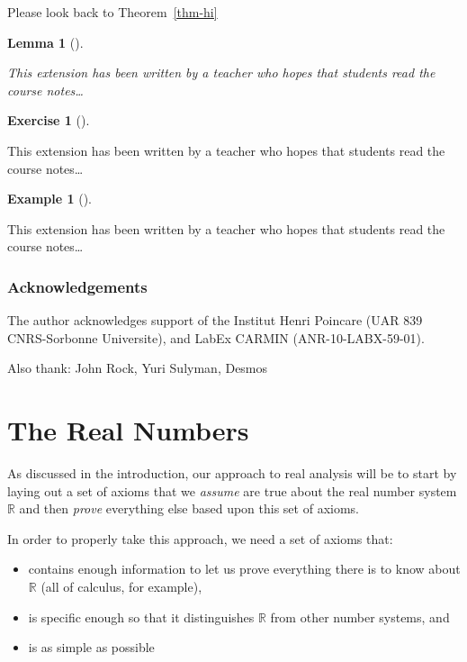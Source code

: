 \documentclass[
  letterpaper,
  DIV=11,
  numbers=noendperiod]{scrreprt}
\providecommand{\tightlist}{%
  \setlength{\itemsep}{0pt}\setlength{\parskip}{0pt}}
\def\R{\mathbb R}
\theoremstyle{plain}
\theoremstyle{definition}
\newtheorem{exercise}{Exercise}[chapter]
\theoremstyle{plain}
\theoremstyle{plain}
\newtheorem{lemma}{Lemma}[chapter]
\theoremstyle{definition}
\newtheorem{example}{Example}[chapter]
\theoremstyle{definition}
\theoremstyle{remark}
\begin{document}
Please look back to Theorem~\ref{thm-hi}

\begin{lemma}[]\protect\hypertarget{lem-bye}{}\label{lem-bye}

This extension has been written by a teacher who hopes that students
read the course notes\ldots{}

\end{lemma}

\begin{exercise}[]\protect\hypertarget{exr-next}{}\label{exr-next}

This extension has been written by a teacher who hopes that students
read the course notes\ldots{}

\end{exercise}

\begin{example}[]\protect\hypertarget{exm-the}{}\label{exm-the}

This extension has been written by a teacher who hopes that students
read the course notes\ldots{}

\end{example}

\section{Acknowledgements}\label{acknowledgements}

The author acknowledges support of the Institut Henri
Poincar\textquotesingle e (UAR 839 CNRS-Sorbonne
Universit\textquotesingle e), and LabEx CARMIN (ANR-10-LABX-59-01).

Also thank: John Rock, Yuri Sulyman, Desmos

\part{The Real Numbers}

As discussed in the introduction, our approach to real analysis will be
to start by laying out a set of axioms that we \emph{assume} are true
about the real number system \(\R\) and then \emph{prove} everything
else based upon this set of axioms.

In order to properly take this approach, we need a set of axioms that:

\begin{itemize}
\tightlist
\item
  contains enough information to let us prove everything there is to
  know about \(\R\) (all of calculus, for example),
\item
  is specific enough so that it distinguishes \(\R\) from other number
  systems, and
\item
  is as simple as possible
\end{itemize}
\end{document}
